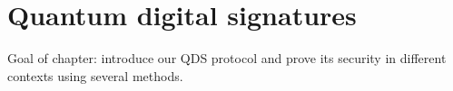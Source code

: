 \chapter{Quantum digital signatures}
Goal of chapter: introduce our QDS protocol and prove its security in different contexts using several methods.